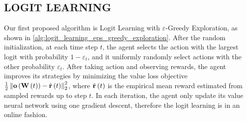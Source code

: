 \subsection{LOGIT LEARNING}
\label{subsec:logit_learning}

Our first proposed algorithm is Logit Learning with $\varepsilon$-Greedy Exploration, as shown in \cref{alg:logit_learning_eps_greedy_exploration}. After the random initialization, at each time step $t$, the agent selects the action with the largest logit with probability $1 - \varepsilon_t$, and it uniformly randomly select actions with the other probability $\varepsilon_t$. After taking action and observing rewards, the agent improves its strategies by minimizing the value loss objective $\frac{1}{2} \left\| {\mathbf{o}}\left( {\mathbf{W}}\left(t\right)\right) - \hat{{\mathbf{r}}}\left(t\right) \right\|_2^2$, where $\hat{{\mathbf{r}}}\left(t\right)$ is the empirical mean reward estimated from sampled rewards up to step $t$. In each iteration, the agent only update its value neural network using one gradient descent, therefore the logit learning is in an online fashion.


